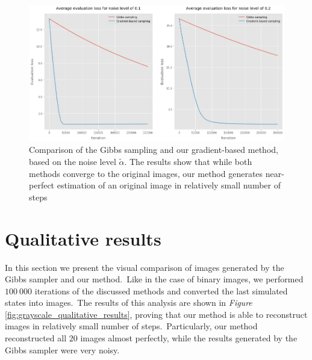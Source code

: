 \documentclass[a4paper, 11pt, onecolumn, openany, titlepage]{report}
\theoremstyle{default_theorem_style}\newtheorem{theorem}{Theorem}
\theoremstyle{default_theorem_style}\newtheorem{definition}{Definition}
\begin{document}
\begin{figure}[H]
\centering
\includegraphics[scale=0.44]{grayscale_noise_level_plots}
\caption{Comparison of the Gibbs sampling and our gradient-based method, based on the noise level
$\tilde{\alpha}$. The results show that while both methods converge to the original images, our method generates
near-perfect estimation of an original image in relatively small number of steps}
\label{fig:grayscale_noise_level_plots}
\end{figure}

\section{Qualitative results}

In this section we present the visual comparison of images generated by the Gibbs sampler and our method.\ Like
in the case of binary images, we performed $100\ 000$ iterations of the discussed methods and converted the last
simulated states into images.\ The results of this analysis are shown in \textit{Figure}
\ref{fig:grayscale_qualitative_results}, proving that our method is able to reconstruct images in relatively
small number of steps.\ Particularly, our method reconstructed all $20$ images almost perfectly, while the
results generated by the Gibbs sampler were very noisy.
\end{document}
